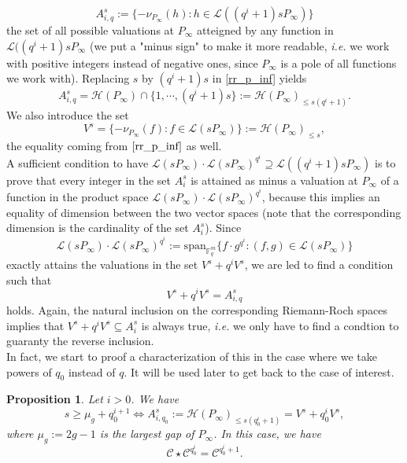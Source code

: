 \documentclass[a4paper]{article}
\newtheorem{prop1}{Proposition}
\newcommand{\calH}{\mathcal{H}}
\newcommand{\calL}{\mathcal{L}}
\newcommand{\calC}{\mathcal{C}}
\begin{document}
\[A^s_{i,q}:=\{-\nu_{P_{\infty}}(h) : h \in \calL((q^i+1)sP_{\infty}) \}\] 
the set of all possible valuations at $P_{\infty}$ atteigned by any function in $\calL((q^i+1)sP_{\infty}$ (we put a "minus sign" to make it more readable, \emph{i.e.} we work with positive integers instead of negative ones, since $P_{\infty}$ is a pole of all functions we work with). Replacing $s$ by $(q^i+1)s$ in \eqref{rr_p_inf} yields
\[A^s_{i,q} = \calH(P_{\infty}) \cap \{1,\cdots,(q^i+1)s\} := \calH(P_{\infty})_{\leq s(q^i+1)}.\]
 We also introduce the set 
\[V^s = \{-\nu_{P_{\infty}}(f) : f \in \calL(sP_{\infty})\} := \calH(P_{\infty})_{\leq s},\]
the equality coming from $\eqref{rr_p_inf}$ as well. \\
A sufficient condition to have $\calL(sP_{\infty}) \cdot \calL(sP_{\infty})^{q^i} \supseteq \calL((q^i+1)sP_{\infty})$ is to prove that every integer in the set $A_i^s$ is attained as minus a valuation at $P_{\infty}$ of a function in the product space $\calL(sP_{\infty}) \cdot \calL(sP_{\infty})^{q^i}$, because this implies an equality of dimension between the two vector spaces (note that the corresponding dimension is the cardinality of the set $A_i^s$). Since 
\[\calL(sP_{\infty}) \cdot \calL(sP_{\infty})^{q^i} := \mathrm{span}_{\mathbb{F}_q^m}\{f \cdot g^{q^i} : (f,g) \in \calL(sP_{\infty})\}\]
exactly attains the valuations in the set $V^s+q^iV^s$,
we are led to find a condition such that 
\begin{equation} \label{equalitu_of_valuations}
    V^s+q^iV^s = A^s_{i,q}
\end{equation}
holds. Again, the natural inclusion on the corresponding Riemann-Roch spaces implies that  $V^s+q^iV^s \subseteq A^s_i$ is always true, \emph{i.e.} we only have to find a condtion to guaranty the reverse inclusion. \\
In fact, we start to proof a characterization of this in the case where we take powers of $q_0$ instead of $q$. It will be used later to get back to the case of interest.

\begin{prop1} \label{prop:result_with_valuations_case_q0}
Let $i > 0$. We have 
\[s \geq \mu_g + q_0^{i+1} \iff A^s_{i,q_0} := \calH(P_{\infty})_{\leq s(q_0^i+1)} = V^s+q_0^iV^s,\]
 where $\mu_g := 2g-1$ is the largest gap of $P_{\infty}$. In this case, we have 
 \[ \calC \star \calC^{q_0^i} = \calC^{q_0^i+1}.\]
\end{prop1}
\end{document}
